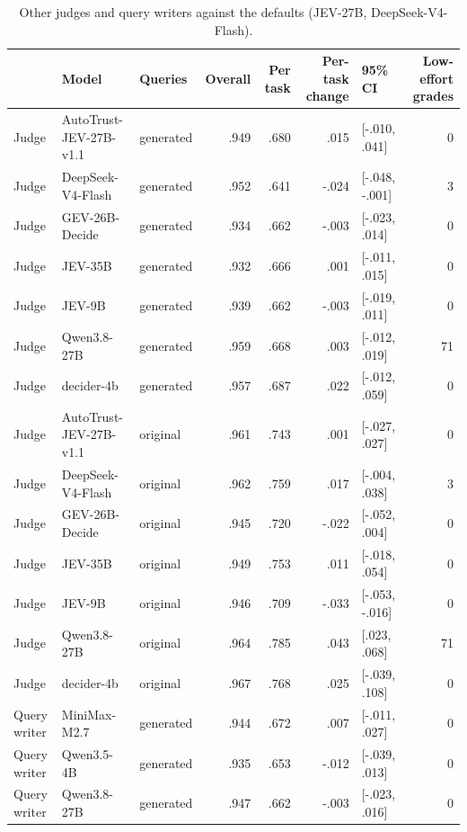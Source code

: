 \begin{table}[t]
\centering\small
\setlength{\tabcolsep}{5pt}
\begin{tabular}{lllrrrlr}
\toprule
 & \textbf{Model} & \textbf{Queries} & \textbf{Overall} & \textbf{Per task} & \textbf{Per-task change} & \textbf{95\% CI} & \textbf{Low-effort grades} \\
\midrule
Judge & AutoTrust-JEV-27B-v1.1 & generated & .949 & .680 & .015 & [-.010, .041] & 0 \\
Judge & DeepSeek-V4-Flash & generated & .952 & .641 & -.024 & [-.048, -.001] & 3 \\
Judge & GEV-26B-Decide & generated & .934 & .662 & -.003 & [-.023, .014] & 0 \\
Judge & JEV-35B & generated & .932 & .666 & .001 & [-.011, .015] & 0 \\
Judge & JEV-9B & generated & .939 & .662 & -.003 & [-.019, .011] & 0 \\
Judge & Qwen3.8-27B & generated & .959 & .668 & .003 & [-.012, .019] & 71 \\
Judge & decider-4b & generated & .957 & .687 & .022 & [-.012, .059] & 0 \\
Judge & AutoTrust-JEV-27B-v1.1 & original & .961 & .743 & .001 & [-.027, .027] & 0 \\
Judge & DeepSeek-V4-Flash & original & .962 & .759 & .017 & [-.004, .038] & 3 \\
Judge & GEV-26B-Decide & original & .945 & .720 & -.022 & [-.052, .004] & 0 \\
Judge & JEV-35B & original & .949 & .753 & .011 & [-.018, .054] & 0 \\
Judge & JEV-9B & original & .946 & .709 & -.033 & [-.053, -.016] & 0 \\
Judge & Qwen3.8-27B & original & .964 & .785 & .043 & [.023, .068] & 71 \\
Judge & decider-4b & original & .967 & .768 & .025 & [-.039, .108] & 0 \\
Query writer & MiniMax-M2.7 & generated & .944 & .672 & .007 & [-.011, .027] & 0 \\
Query writer & Qwen3.5-4B & generated & .935 & .653 & -.012 & [-.039, .013] & 0 \\
Query writer & Qwen3.8-27B & generated & .947 & .662 & -.003 & [-.023, .016] & 0 \\
\bottomrule
\end{tabular}
\caption{Other judges and query writers against the defaults (JEV-27B, DeepSeek-V4-Flash).}
\label{tab:judges}
\end{table}
